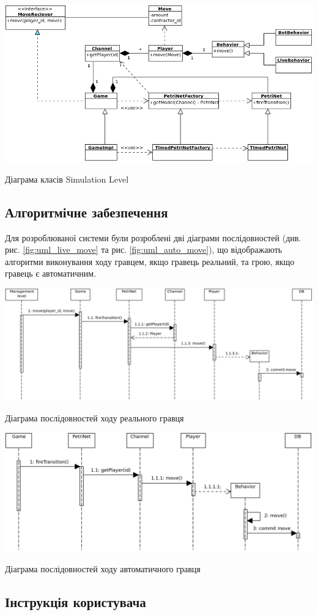 \begin{stdfigure}
    \includegraphics[width=7in]{images/uml/simulation_level.png}
    \caption{Діаграма класів Simulation Level}
    \label{fig:uml_simulation}
\end{stdfigure}   

\subsection{Алгоритмічне забезпечення}
Для розроблюваної системи були розроблені дві діаграми послідовностей (див. рис. \ref{fig:uml_live_move} та рис. \ref{fig:uml_auto_move}), що відображають алгоритми виконування ходу гравцем, якщо гравець реальний, та грою, якщо гравець є автоматичним.
\begin{stdfigure}
    \includegraphics[width=7in]{images/uml/live_move.png}
    \caption{Діаграма послідовностей ходу реального гравця}
    \label{fig:uml_live_move}
\end{stdfigure}   

\begin{stdfigure}
    \includegraphics[width=7in]{images/uml/automate_move.png}
    \caption{Діаграма послідовностей ходу автоматичного гравця}
    \label{fig:uml_auto_move}
\end{stdfigure}   
\subsection{Інструкція користувача}

